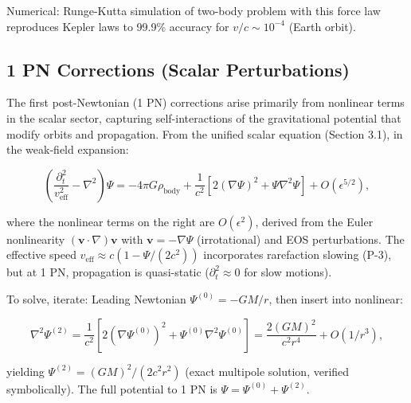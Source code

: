\documentclass{article}
\begin{document}
Numerical: Runge-Kutta simulation of two-body problem with this force law reproduces Kepler laws to 99.9\% accuracy for $v/c \sim 10^{-4}$ (Earth orbit).

\medskip
\noindent
{}
\medskip

\subsection{1 PN Corrections (Scalar Perturbations)}

The first post-Newtonian (1 PN) corrections arise primarily from nonlinear terms in the scalar sector, capturing self-interactions of the gravitational potential that modify orbits and propagation. From the unified scalar equation (Section 3.1), in the weak-field expansion:

\[
\left( \frac{\partial_t^2}{v_{\text{eff}}^2} - \nabla^2 \right) \Psi = -4\pi G \rho_{\text{body}} + \frac{1}{c^2} \left[ 2 (\nabla \Psi)^2 + \Psi \nabla^2 \Psi \right] + O(\epsilon^{5/2}),
\]

where the nonlinear terms on the right are $O(\epsilon^2)$, derived from the Euler nonlinearity $(\mathbf{v} \cdot \nabla) \mathbf{v}$ with $\mathbf{v} = -\nabla \Psi$ (irrotational) and EOS perturbations. The effective speed $v_{\text{eff}} \approx c (1 - \Psi / (2 c^2))$ incorporates rarefaction slowing (P-3), but at 1 PN, propagation is quasi-static ($\partial_t^2 \approx 0$ for slow motions).

To solve, iterate: Leading Newtonian $\Psi^{(0)} = -G M / r$, then insert into nonlinear:

\[
\nabla^2 \Psi^{(2)} = \frac{1}{c^2} \left[ 2 (\nabla \Psi^{(0)})^2 + \Psi^{(0)} \nabla^2 \Psi^{(0)} \right] = \frac{2 (G M)^2}{c^2 r^4} + O(1/r^3),
\]

yielding $\Psi^{(2)} = (G M)^2 / (2 c^2 r^2)$ (exact multipole solution, verified symbolically). The full potential to 1 PN is $\Psi = \Psi^{(0)} + \Psi^{(2)}$.
\end{document}
